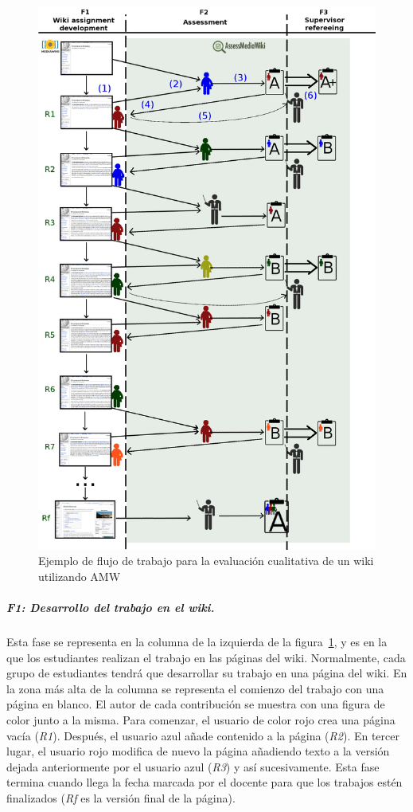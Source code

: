 \begin{figure}
  \begin{center}
    \includegraphics[scale=0.27]{AmwDiagram.png}
  \end{center}
  \caption{Ejemplo de flujo de trabajo para la evaluación cualitativa de un wiki utilizando AMW}
  \label{fig:AmwDiagram}
\end{figure}

			\subparagraph*{F1: Desarrollo del trabajo en el wiki.}

			Esta fase se representa en la columna de la izquierda de la figura~\ref{fig:AmwDiagram}, y es en la que los estudiantes realizan el trabajo en las páginas del wiki. Normalmente, cada grupo de estudiantes tendrá que desarrollar su trabajo en una página del wiki. En la zona más alta de la columna se representa el comienzo del trabajo con una página en blanco. El autor de cada contribución se muestra con una figura de color junto a la misma. Para comenzar, el usuario de color rojo crea una página vacía (\emph{R1}). Después, el usuario azul añade contenido a la página (\emph{R2}). En tercer lugar, el usuario rojo modifica de nuevo la página añadiendo texto a la versión dejada anteriormente por el usuario azul (\emph{R3}) y así sucesivamente. Esta fase termina cuando llega la fecha marcada por el docente para que los trabajos estén finalizados (\emph{Rf} es la versión final de la página).

